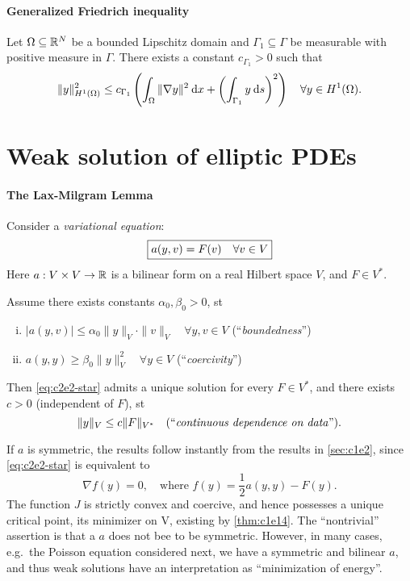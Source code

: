 \documentclass[../skript.tex]{subfiles}
\begin{document}
\paragraph{Generalized Friedrich inequality}
\begin{theorem} %
\label{thm:c2e9}
Let $\Omega \subseteq \mathbb{R}^N$ be a bounded Lipschitz domain and $\Gamma_1 \subseteq \Gamma$ be measurable with positive measure in $\Gamma$. There exists a constant $c_{\Gamma_1} > 0$ such that
\[
	\| y \|_{H^1(\Omega)}^2 \leq c_{\Gamma_1} \left( \int_\Omega \| \nabla y \|^2 \:\mathrm{d}x + \left( \int_{\Gamma_1} y \:\mathrm{d}s \right)^2 \right) \quad \forall y \in H^1(\Omega).
\]
\end{theorem}
\section{Weak solution of elliptic PDEs} %
\label{sec:c2e2}
\paragraph{The Lax-Milgram Lemma}
Consider a \emph{variational equation}:
\begin{equation}
\label{eq:c2e2-star}
	\boxed{a(y, v) = F(v) \quad \forall v \in V}
	\opttag{$\star$}
\end{equation}
Here $a : V \times V \to \mathbb{R}$ is a bilinear form on a real Hilbert space $V$, and $F \in V^*$.
\begin{theorem} %
\label{thm:c2e10}
Assume there exists constants $\alpha_0, \beta_0 > 0$, \ac{st}
\begin{enumerate}[(i)]
\item $|a(y, v)| \leq \alpha_0 \| y \|_V \cdot \| v \|_V \quad \forall y, v \in V$ (``\emph{boundedness}'')
\item $a(y,y) \geq \beta_0 \| y \|_V^2 \quad \forall y \in V$ (``\emph{coercivity}'')
\end{enumerate}
Then \cref{eq:c2e2-star} admits a unique solution for every $F \in V^*$, and there exists $c > 0$ (independent of $F$), \ac{st}
\[
	\| y \|_V \leq c \| F \|_{V^*} \quad \text{(``\emph{continuous dependence on data}'')}.
\]
\end{theorem}
\begin{remark} %
\label{rem:c2e11}
If $a$ is symmetric, the results follow instantly from the results in \cref{sec:c1e2}, since \cref{eq:c2e2-star} is equivalent to
\[
	\nabla f(y) = 0, \quad \text{where } f(y) = \frac{1}{2} a(y, y) - F(y).
\]
The function $J$ is strictly convex and coercive, and hence possesses a unique critical point, its minimizer on V, existing by \cref{thm:c1e14}.
The ``nontrivial'' assertion is that a $a$ does not bee to be symmetric.
However, in many cases, e.g.\ the Poisson equation considered next, we have a symmetric and bilinear $a$, and thus weak solutions have an interpretation as ``minimization of energy''. 
\end{remark}
\end{document}
